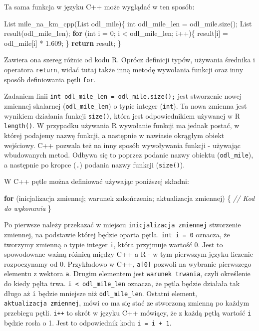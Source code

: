 \documentclass[paper=6in:9in,pagesize=pdftex,headinclude=on,footinclude=on,10pt]{scrbook}
\newenvironment{Shaded}{\begin{snugshade}}{\end{snugshade}}
\newcommand{\CommentTok}[1]{\textcolor[rgb]{0.56,0.35,0.01}{\textit{#1}}}
\newcommand{\ControlFlowTok}[1]{\textcolor[rgb]{0.13,0.29,0.53}{\textbf{#1}}}
\newcommand{\DataTypeTok}[1]{\textcolor[rgb]{0.13,0.29,0.53}{#1}}
\newcommand{\DecValTok}[1]{\textcolor[rgb]{0.00,0.00,0.81}{#1}}
\newcommand{\FloatTok}[1]{\textcolor[rgb]{0.00,0.00,0.81}{#1}}
\newcommand{\NormalTok}[1]{#1}
\begin{document}
Ta sama funkcja w języku C++ może wyglądać w ten sposób:

\begin{Shaded}
\begin{Highlighting}[]
\NormalTok{List mile_na_km_cpp(List odl_mile)\{}
  \DataTypeTok{int}\NormalTok{ odl_mile_len = odl_mile.size();}
\NormalTok{  List result(odl_mile_len);}
  \ControlFlowTok{for}\NormalTok{ (}\DataTypeTok{int}\NormalTok{ i = }\DecValTok{0}\NormalTok{; i < odl_mile_len; i++)\{}
\NormalTok{    result[i] = odl_mile[i] * }\FloatTok{1.609}\NormalTok{;}
\NormalTok{  \}}
  \ControlFlowTok{return}\NormalTok{ result;}
\NormalTok{\}}
\end{Highlighting}
\end{Shaded}

Zawiera ona szereg różnic od kodu R.
Oprócz definicji typów, używania średnika i operatora \texttt{return}, widać tutaj także inną metodę wywołania funkcji oraz inny sposób definiowania pętli \texttt{for}.

Zadaniem linii \texttt{int\ odl\_mile\_len\ =\ odl\_mile.size();} jest stworzenie nowej zmiennej skalarnej (\texttt{odl\_mile\_len}) o typie integer (\texttt{int}).
Ta nowa zmienna jest wynikiem działania funkcji \texttt{size()}, która jest odpowiednikiem używanej w R \texttt{length()}.
W przypadku używania R wywołanie funkcji ma jednak postać, w której podajemy nazwę funkcji, a następnie w nawiasie okrągłym obiekt wejściowy.
C++ pozwala też na inny sposób wywoływania funkcji - używając wbudowanych metod.
Odbywa się to poprzez podanie nazwy obiektu (\texttt{odl\_mile}), a następnie po kropce (\texttt{.}) podania nazwy funkcji (\texttt{size()}).

W C++ pętle można definiować używając poniższej składni:

\begin{Shaded}
\begin{Highlighting}[]
\ControlFlowTok{for}\NormalTok{ (inicjalizacja zmiennej; warunek zakończenia; aktualizacja zmiennej) \{}
  \CommentTok{// Kod do wykonania}
\NormalTok{\}}
\end{Highlighting}
\end{Shaded}

Po pierwsze należy przekazać w miejscu \texttt{inicjalizacja\ zmiennej} stworzenie zmiennej, na podstawie której będzie oparta pętla.
\texttt{int\ i\ =\ 0} oznacza, że tworzymy zmienną o typie integer \texttt{i}, która przyjmuje wartość 0.
Jest to spowodowane ważną różnicą między C++ a R - w tym pierwszym języku liczenie rozpoczynamy od 0.
Przykładowo w C++, \texttt{a{[}0{]}} pozwoli na wybranie pierwszego elementu z wektora \texttt{a}.
Drugim elementem jest \texttt{warunek\ trwania}, czyli określenie do kiedy pęlta trwa.
\texttt{i\ \textless{}\ odl\_mile\_len} oznacza, że pętla będzie działała tak długo aż \texttt{i} będzie mniejsze niż \texttt{odl\_mile\_len}.
Ostatni element, \texttt{aktualizacja\ zmiennej}, mówi co ma się stać ze stworzoną zmienną po każdym przebiegu pętli.
\texttt{i++} to skrót w języku C++ mówiący, że z każdą pętlą wartość \texttt{i} będzie rosła o 1.
Jest to odpowiednik kodu \texttt{i\ =\ i\ +\ 1}.
\end{document}
